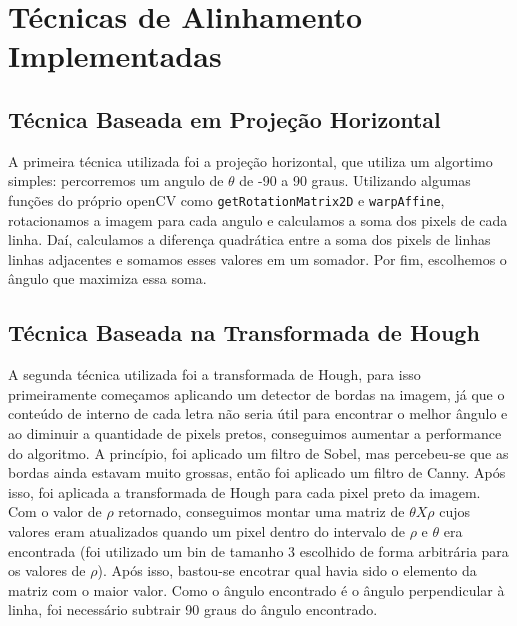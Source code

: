 \documentclass{article}
\begin{document}
\section{Técnicas de Alinhamento Implementadas}

\subsection{Técnica Baseada em Projeção Horizontal}
A primeira técnica utilizada foi a projeção horizontal, que utiliza um algortimo simples: percorremos um angulo de $\theta$ de -90 a 90 graus. Utilizando algumas funções do próprio openCV como \texttt{getRotationMatrix2D} e \texttt{warpAffine}, rotacionamos a imagem para cada angulo e calculamos a soma dos pixels de cada linha. Daí, calculamos a diferença quadrática entre a soma dos pixels de linhas linhas adjacentes e somamos esses valores em um somador. Por fim, escolhemos o ângulo que maximiza essa soma.

\subsection{Técnica Baseada na Transformada de Hough}
A segunda técnica utilizada foi a transformada de Hough, para isso primeiramente começamos aplicando um detector de bordas na imagem, já que o conteúdo de interno de cada letra não seria útil para encontrar o melhor ângulo e ao diminuir a quantidade de pixels pretos, conseguimos aumentar a performance do algoritmo. A princípio, foi aplicado um filtro de Sobel, mas percebeu-se que as bordas ainda estavam muito grossas, então foi aplicado um filtro de Canny. Após isso, foi aplicada a transformada de Hough para cada pixel preto da imagem. Com o valor de $\rho$ retornado, conseguimos montar uma matriz de $\theta X \rho$ cujos valores eram atualizados quando um pixel dentro do intervalo de $\rho$ e $\theta$ era encontrada (foi utilizado um bin de tamanho 3 escolhido de forma arbitrária para os valores de $\rho$). Após isso, bastou-se encotrar qual havia sido o elemento da matriz com o maior valor. Como o ângulo encontrado é o ângulo perpendicular à linha, foi necessário subtrair 90 graus do ângulo encontrado.
\end{document}
